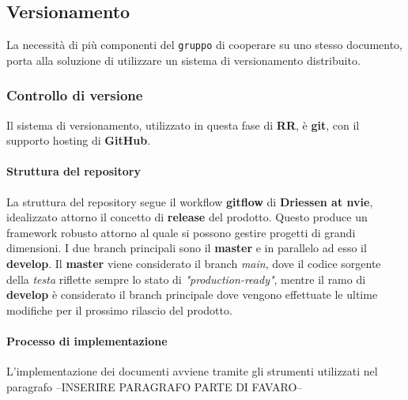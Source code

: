 \subsection{Versionamento}
La necessità di più componenti del \texttt{gruppo} di cooperare su uno stesso documento, porta alla soluzione di utilizzare un sistema di versionamento distribuito. 


\subsubsection{Controllo di versione}
Il sistema di versionamento, utilizzato in questa fase di \textbf{RR}, è \textbf{git}, con il supporto hosting di \textbf{GitHub}.

\paragraph{Struttura del repository}
La struttura del repository segue il workflow \textbf{gitflow} di \textbf{Driessen at nvie}, idealizzato attorno il concetto di \textbf{release} del prodotto. Questo produce
un framework robusto attorno al quale si possono gestire progetti di grandi dimensioni. I due branch principali sono il \textbf{master} e in parallelo ad esso il \textbf{develop}. 
Il \textbf{master} viene considerato il branch \textit{main}, dove il codice sorgente della \textit{testa} riflette sempre lo stato di \textit{"production-ready"},
mentre il ramo di \textbf{develop} è considerato il branch principale dove vengono effettuate le ultime modifiche per il prossimo rilascio del prodotto. 


\paragraph{Processo di implementazione}
L'implementazione dei documenti avviene tramite gli strumenti utilizzati nel paragrafo --INSERIRE PARAGRAFO PARTE DI FAVARO--\\

